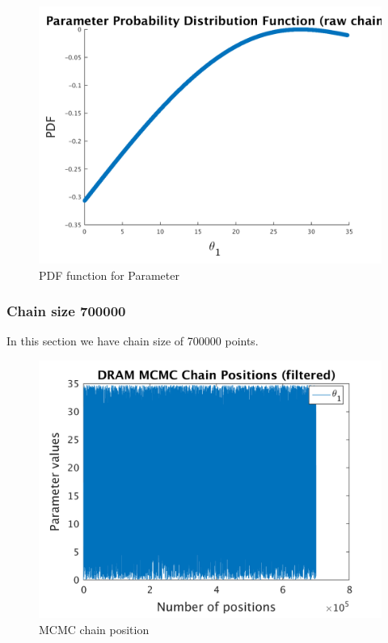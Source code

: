 \begin{figure}[h!]
  
  \centering
   \includegraphics[scale=0.75]{output_300000/ip_logLike_unified}
   \caption{PDF function for Parameter }
\end{figure}


%
\subsubsection{Chain size 700000 }


In this section we have chain size of 700000 points. 

\begin{figure}[h!]
  
  \centering
   \includegraphics[scale=0.75]{output_700000/simple_ip_chain_pos_filt}
   \caption{MCMC chain position }
\end{figure}


